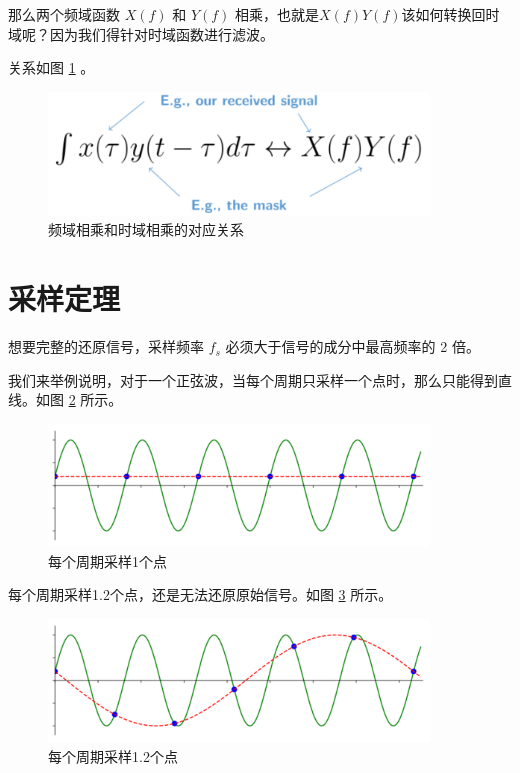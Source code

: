 \documentclass[lang=cn,newtx,10pt,scheme=chinese]{elegantbook}
\begin{document}
那么两个频域函数 $X(f)$ 和 $Y(f)$ 相乘，也就是$X(f)Y(f)$该如何转换回时域呢？因为我们得针对时域函数进行滤波。

关系如图 \ref{fig:xfyf} 。

\begin{figure}[!htb]
\centering
\includegraphics[width=0.9\textwidth]{xfyf.pdf}
\caption{频域相乘和时域相乘的对应关系}
\label{fig:xfyf}
\end{figure}

\section{采样定理}

\begin{theorem}[采样定理]
    想要完整的还原信号，采样频率 $f_s$ 必须大于信号的成分中最高频率的 2 倍。
\end{theorem}

我们来举例说明，对于一个正弦波，当每个周期只采样一个点时，那么只能得到直线。如图 \ref{fig:sampling_Fs_0.3} 所示。

\begin{figure}[!htb]
\centering
\includegraphics[width=0.9\textwidth]{sampling_Fs_0.3.pdf}
\caption{每个周期采样1个点}
\label{fig:sampling_Fs_0.3}
\end{figure}

每个周期采样1.2个点，还是无法还原原始信号。如图 \ref{fig:sampling_Fs_0.36} 所示。

\begin{figure}[!htb]
\centering
\includegraphics[width=0.9\textwidth]{sampling_Fs_0.36.pdf}
\caption{每个周期采样1.2个点}
\label{fig:sampling_Fs_0.36}
\end{figure}
\end{document}
